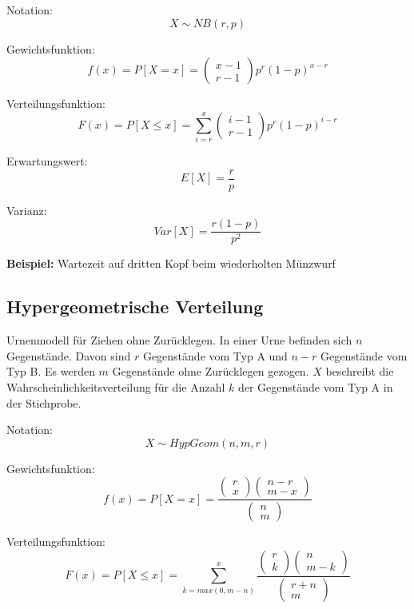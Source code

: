 \documentclass[10pt,a4paper,twocolumn]{article}
\begin{document}
Notation:
\[
X \sim NB(r,p)
\]

Gewichtsfunktion:
\[
f(x)=P[X=x]=\left(
	\begin{array}{c}
		x-1 \\
		r-1
	\end{array}
\right)p^{r}(1-p)^{x-r}
\]

Verteilungsfunktion:
\[
F(x)=P[X \leq x]=\sum \limits_{i=r}^x
\left(
	\begin{array}{c}
		i-1 \\
		r-1
	\end{array}
\right)p^{r}(1-p)^{i-r}
\]

Erwartungswert:
\[
E[X]=\frac{r}{p}
\]

Varianz:
\[
Var[X]=\frac{r(1-p)}{p^2}
\]

\textbf{Beispiel:} Wartezeit auf dritten Kopf beim wiederholten Münzwurf

\subsection{Hypergeometrische Verteilung}
Urnenmodell für Ziehen ohne Zurücklegen. In einer Urne befinden sich $n$ Gegenstände. Davon sind $r$ Gegenstände vom Typ A und $n-r$ Gegenstände vom Typ B. Es werden $m$ Gegenstände ohne Zurücklegen gezogen. $X$ beschreibt die Wahrscheinlichkeitsverteilung für die Anzahl $k$ der Gegenstände vom Typ A in der Stichprobe.

\vspace{10pt}

Notation:
\[
X \sim HypGeom(n,m,r)
\]

Gewichtsfunktion:
\[
f(x)=P[X=x]=\frac{
\left(
	\begin{array}{c}
		r \\ x
	\end{array}
\right)
\left(
	\begin{array}{c}
		n-r \\ m-x
	\end{array}
\right)
}{
\left(
	\begin{array}{c}
		n \\ m
	\end{array}
\right)
}
\]

Verteilungsfunktion:
\[
F(x)=P[X \leq x]=
\sum \limits_{k=max(0,m-n)}^x \frac{
\left(
	\begin{array}{c}
		r \\ k
	\end{array}
\right)
\left(
	\begin{array}{c}
		n \\ m-k
	\end{array}
\right)
}{
\left(
	\begin{array}{c}
		r+n \\ m
	\end{array}
\right)
}
\]
\end{document}
